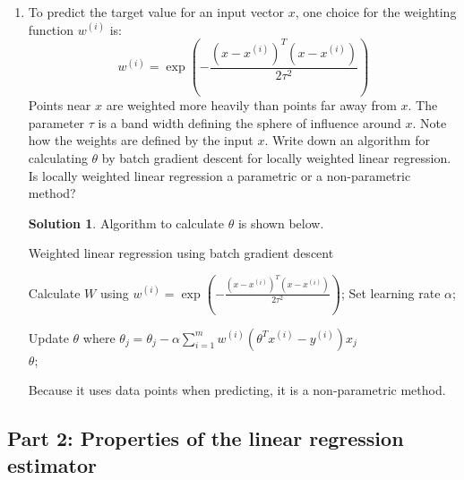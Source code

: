 \documentclass[]{book}
\theoremstyle{definition}
\newtheorem*{soln}{Solution}
\begin{document}
\begin{enumerate}
	\item To predict the target value for an input vector $x$, one choice for the weighting function $w^{(i)}$ is:
	$$w^{(i)}= \exp({-\frac{(x -x^{(i)})^T (x-x^{(i)})}{2 \tau^2}})$$
	Points near $x$ are weighted more heavily than points far away from $x$. The parameter $\tau$ is a band width defining the sphere of influence around $x$. Note how the weights are defined by the input $x$. Write down an algorithm for calculating $\theta$ by batch gradient descent for locally weighted linear regression. Is locally weighted linear regression a parametric or a non-parametric method?
	
	\begin{soln}
		Algorithm to calculate $\theta$ is shown below. 
		
		{\centering
			\begin{minipage}{.75\linewidth}
				\begin{algorithm}[H]
					\caption{Weighted linear regression using batch gradient descent}  
					\begin{algorithmic}[1]  
						\State Calculate $W$ using $w^{(i)}= \exp({-\frac{(x -x^{(i)})^T (x-x^{(i)})}{2 \tau^2}})$;  
						\State Set learning rate $\alpha$;
						
						\State Update $\theta$ where $\theta_j = \theta_j - \alpha \sum_{i = 1}^{m}w^{(i)}(\theta^Tx^{(i)}-y^{(i)})x_j$ 
						\EndFor 
						\\  
						\Return $\theta$;  
					\end{algorithmic}  
				\end{algorithm}   
			\end{minipage}
		}
		  
		Because it uses data points when predicting, it is a non-parametric method.
	\end{soln}
\end{enumerate}

\subsection*{Part 2: Properties of the linear regression estimator}
\end{document}
